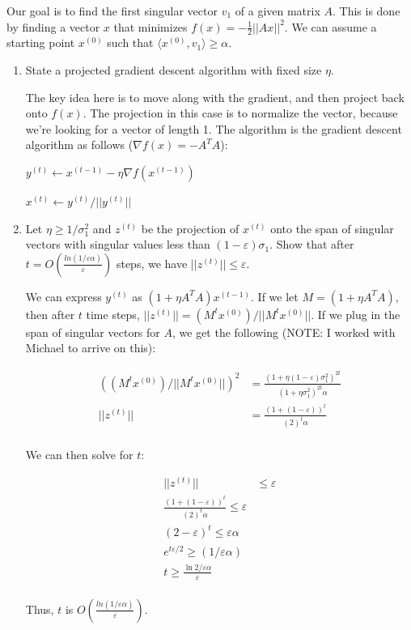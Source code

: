 \documentclass[11pt]{article}
\theoremstyle{definition}
\theoremstyle{case}
\theoremstyle{theorem}
\begin{document}
Our goal is to find the first singular vector $v_1$ of a given matrix $A$. This is done by finding a vector $x$
that minimizes $f(x) = - \frac{1}{2} ||Ax||^2$. We can assume a starting point $x^{(0)}$ such that 
$\langle x^{(0)}, v_1 \rangle \geq \alpha$. 

\begin{enumerate}[label=(\alph*)]

\item State a projected gradient descent algorithm with fixed size $\eta$.

The key idea here is to move along with the gradient, and then project back onto $f(x)$. The projection in this
case is to normalize the vector, because we're looking for a vector of length 1. The algorithm is
the gradient descent algorithm as follows ($\nabla f(x) = - A^T A$): 

$y^{(t)} \longleftarrow x^{(t-1)} - \eta \nabla f(x^{(t-1)})$

$x^{(t)} \longleftarrow y^{(t)} / || y^{(t)} ||$

\item Let $\eta \geq 1/\sigma_1^2$ and $z^{(t)}$ be the projection of $x^{(t)}$ onto the span of singular vectors with
singular values less than $(1 - \varepsilon)\sigma_1$. Show that after $t = O(\frac{ln(1 / \varepsilon \alpha)}{\varepsilon})$ steps, 
we have $||z^{(t)}|| \leq \varepsilon$.

We can express $y^{(t)}$ as $(1 + \eta A^T A) x ^{(t-1)}$. If we let $M = (1 + \eta A^T A)$, then
after $t$ time steps, $||z^{(t)}|| = (M^t x^{(0)}) / || M^t x^{(0)} ||$. If we plug in the span of singular vectors 
for $A$, we get the following (NOTE: I worked with Michael to arrive on this):

\begin{align*}
\left( (M^t x^{(0)}) / || M^t x^{(0)} || \right)^2 &= \frac{(1 + \eta (1 - \varepsilon) \sigma_1^2)^{2t}}{(1 + \eta \sigma_1^2)^{2t} \alpha} \\  
|| z^{(t)} || &= \frac{(1 + (1 - \varepsilon))^{t}}{(2)^{t} \alpha} \\  
\end{align*}

We can then solve for $t$:

\begin{align*}
|| z^{(t)} || &\leq \varepsilon \\
\frac{(1 + (1 - \varepsilon))^{t}}{(2)^{t} \alpha} \leq \varepsilon \\
(2 - \varepsilon)^t \leq \varepsilon \alpha \\
e^{t \varepsilon/2} \geq (1 / \varepsilon \alpha) \\
t \geq \frac{\ln{ 2 / \varepsilon \alpha}}{\varepsilon} \\
\end{align*}

Thus, $t$ is $O(\frac{ln(1 / \varepsilon \alpha)}{\varepsilon})$.

\end{enumerate}
\end{document}
